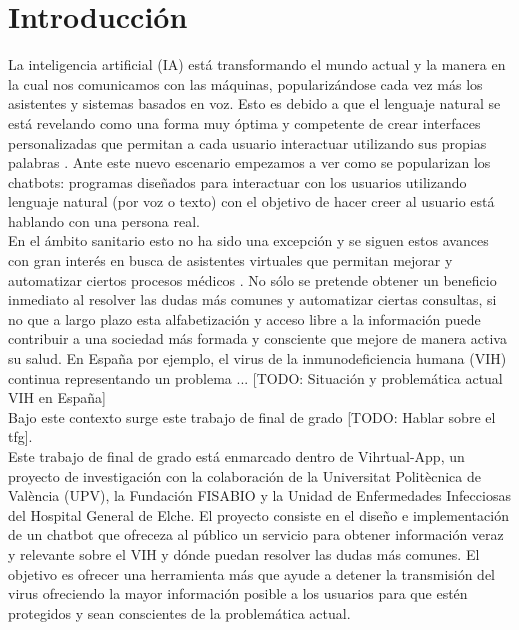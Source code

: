 \section{Introducción}
La inteligencia artificial (IA) está transformando el mundo actual y la manera en la cual nos comunicamos con las máquinas, popularizándose cada vez más los asistentes y sistemas basados en voz. Esto es debido a que el lenguaje natural se está revelando como una forma muy óptima y competente de crear interfaces personalizadas que permitan a cada usuario interactuar utilizando sus propias palabras \cite{naturalDialogue} . Ante este nuevo escenario empezamos a ver como se popularizan los chatbots: programas diseñados para interactuar con los usuarios utilizando lenguaje natural (por voz o texto) con el objetivo de hacer creer al usuario está hablando con una persona real. \\

En el ámbito sanitario esto no ha sido una excepción y se siguen estos avances con gran interés en busca de asistentes virtuales que permitan mejorar y automatizar ciertos procesos médicos \cite{healthAgents}. No sólo se pretende obtener un beneficio inmediato al resolver las dudas más comunes y automatizar ciertas consultas, si no que a largo plazo esta alfabetización y acceso libre a la información puede contribuir a una sociedad más formada y consciente que mejore de manera activa su salud. En España por ejemplo, el virus de la inmunodeficiencia humana (VIH) continua representando un problema ... [TODO: Situación y problemática actual VIH en España]\\

Bajo este contexto surge este trabajo de final de grado [TODO: Hablar sobre el tfg].\\

Este trabajo de final de grado está enmarcado dentro de Vihrtual-App, un proyecto de investigación con la colaboración de la Universitat Politècnica de València (UPV), la Fundación FISABIO y la Unidad de Enfermedades Infecciosas del Hospital General de Elche. El proyecto consiste en el diseño e implementación de un chatbot que ofreceza al público un servicio para obtener información veraz y relevante sobre el VIH y dónde puedan resolver las dudas más comunes. El objetivo es ofrecer una herramienta más que ayude a detener la transmisión del virus ofreciendo la mayor información posible a los usuarios para que estén protegidos y sean conscientes de la problemática actual.\\ %

